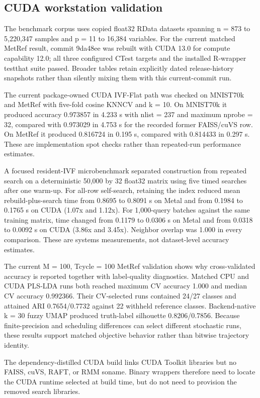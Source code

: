 \documentclass[twoside,11pt]{article}
\begin{document}
\begin{small}
\subsection{CUDA workstation validation}
The benchmark corpus uses copied float32 RData datasets spanning n = 873 to 5,220,347 samples and p = 11 to 16,384 variables. For the current matched MetRef result, commit 9da48ee was rebuilt with CUDA 13.0 for compute capability 12.0; all three configured CTest targets and the installed R-wrapper testthat suite passed. Broader tables retain explicitly dated release-history snapshots rather than silently mixing them with this current-commit run.

The current package-owned CUDA IVF-Flat path was checked on MNIST70k and MetRef with five-fold cosine KNNCV and k = 10. On MNIST70k it produced accuracy 0.973857 in 4.233 s with nlist = 237 and maximum nprobe = 32, compared with 0.973029 in 4.753 s for the recorded former FAISS/cuVS row. On MetRef it produced 0.816724 in 0.195 s, compared with 0.814433 in 0.297 s. These are implementation spot checks rather than repeated-run performance estimates.

A focused resident-IVF microbenchmark separated construction from repeated search on a deterministic 50,000 by 32 float32 matrix using five timed searches after one warm-up. For all-row self-search, retaining the index reduced mean rebuild-plus-search time from 0.8695 to 0.8091 s on Metal and from 0.1984 to 0.1765 s on CUDA (1.07x and 1.12x). For 1,000-query batches against the same training matrix, time changed from 0.1179 to 0.0306 s on Metal and from 0.0318 to 0.0092 s on CUDA (3.86x and 3.45x). Neighbor overlap was 1.000 in every comparison. These are systems measurements, not dataset-level accuracy estimates.

The current M = 100, Tcycle = 100 MetRef validation shows why cross-validated accuracy is reported together with label-quality diagnostics. Matched CPU and CUDA PLS-LDA runs both reached maximum CV accuracy 1.000 and median CV accuracy 0.992366. Their CV-selected runs contained 24/27 classes and attained ARI 0.7654/0.7732 against 22 withheld reference classes. Backend-native k = 30 fuzzy UMAP produced truth-label silhouette 0.8206/0.7856. Because finite-precision and scheduling differences can select different stochastic runs, these results support matched objective behavior rather than bitwise trajectory identity.

The dependency-distilled CUDA build links CUDA Toolkit libraries but no FAISS, cuVS, RAFT, or RMM soname. Binary wrappers therefore need to locate the CUDA runtime selected at build time, but do not need to provision the removed search libraries.


\end{small}
\end{document}
